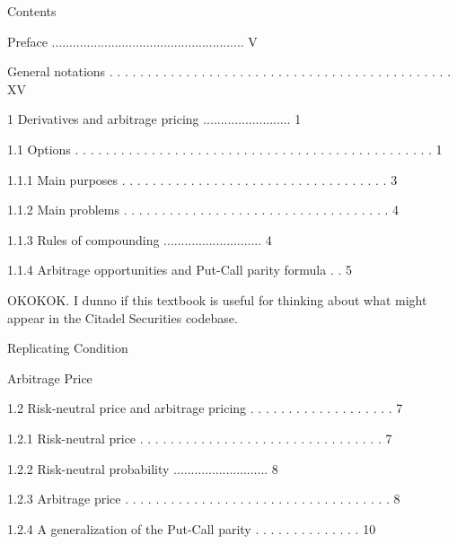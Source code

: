 

Contents



Preface ....................................................... V



General notations . . . . . . . . . . . . . . . . . . . . . . . . . . . . . . . . . . . . . . . . . . . . . XV



1 Derivatives and arbitrage pricing ......................... 1



1.1 Options . . . . . . . . . . . . . . . . . . . . . . . . . . . . . . . . . . . . . . . . . . . . . . . 1



1.1.1 Main purposes . . . . . . . . . . . . . . . . . . . . . . . . . . . . . . . . . . . 3



1.1.2 Main problems . . . . . . . . . . . . . . . . . . . . . . . . . . . . . . . . . . . 4



1.1.3 Rules of compounding ............................ 4



1.1.4 Arbitrage opportunities and Put-Call parity formula . . 5

OKOKOK. I dunno if this textbook is useful for thinking about what might appear in the Citadel Securities codebase.

Replicating Condition

Arbitrage Price

1.2 Risk-neutral price and arbitrage pricing . . . . . . . . . . . . . . . . . . . 7



1.2.1 Risk-neutral price . . . . . . . . . . . . . . . . . . . . . . . . . . . . . . . . 7



1.2.2 Risk-neutral probability ........................... 8



1.2.3 Arbitrage price . . . . . . . . . . . . . . . . . . . . . . . . . . . . . . . . . . . 8



1.2.4 A generalization of the Put-Call parity . . . . . . . . . . . . . . 10



